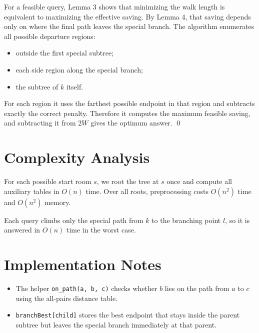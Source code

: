 \documentclass[11pt]{article}
\begin{document}
For a feasible query, Lemma 3 shows that minimizing the walk length is equivalent to maximizing the
effective saving. By Lemma 4, that saving depends only on where the final path leaves the special branch.
The algorithm enumerates all possible departure regions:
\begin{itemize}[leftmargin=*]
    \item outside the first special subtree;
    \item each side region along the special branch;
    \item the subtree of $k$ itself.
\end{itemize}
For each region it uses the farthest possible endpoint in that region and subtracts exactly the correct
penalty. Therefore it computes the maximum feasible saving, and subtracting it from $2W$ gives the optimum
answer. \qed

\section*{Complexity Analysis}

For each possible start room $s$, we root the tree at $s$ once and compute all auxiliary tables in $O(n)$
time. Over all roots, preprocessing costs $O(n^2)$ time and $O(n^2)$ memory.

Each query climbs only the special path from $k$ to the branching point $l$, so it is answered in $O(n)$
time in the worst case.

\section*{Implementation Notes}

\begin{itemize}[leftmargin=*]
    \item The helper \texttt{on\_path(a, b, c)} checks whether $b$ lies on the path from $a$ to $c$ using the
    all-pairs distance table.
    \item \texttt{branchBest[child]} stores the best endpoint that stays inside the parent subtree but leaves
    the special branch immediately at that parent.
\end{itemize}
\end{document}
